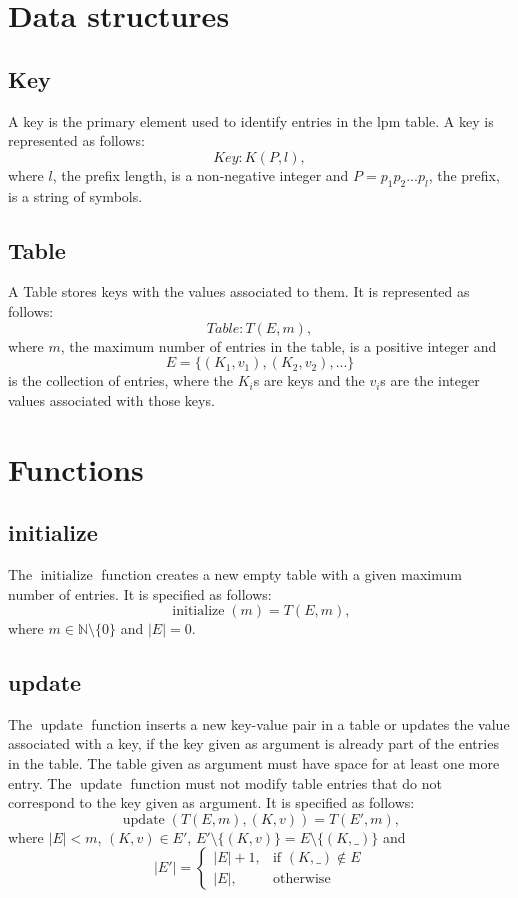 \documentclass{article}
\DeclareMathOperator{\initialize}{initialize}
\DeclareMathOperator{\update}{update}
\begin{document}
\section{Data structures}
\subsection{Key}
A key is the primary element used to identify entries in the lpm table. A key
is represented as follows:
\[
    Key: K(P, l),
\]
where $l$, the prefix length, is a non-negative integer and $P = p_1p_2...p_l$,
the prefix, is a string of symbols.
\subsection{Table}
A Table stores keys with the values associated to them. It is represented as
follows:
\[
    Table: T(E, m),
\]
where $m$, the maximum number of entries in the table, is a positive integer and
\[
    E = \{(K_1, v_1), (K_2, v_2), ...\}
\]
is the collection of entries, where the $K_i$s are keys and the $v_i$s are the
integer values associated with those keys.
\section{Functions}
\subsection{initialize}
The $\initialize$ function creates a new empty table with a given maximum number
of entries. It is specified as follows:
\[
    \initialize(m) = T(E, m),
\]
where $m \in \mathbb{N} \setminus \{0\}$ and $|E| = 0$.
\subsection{update}
The $\update$ function inserts a new key-value pair in a table or updates the value
associated with a key, if the key given as argument is already part of the
entries in the table. The table given as argument must have space for at least
one more entry. The $\update$ function must not modify table entries that do not
correspond to the key given as argument. It is specified as follows:
\[
    \update(T(E, m), (K, v)) = T(E', m),
\]
where $|E| < m$, $(K, v) \in E'$,
$E' \setminus \{(K, v)\} = E \setminus \{(K, \_)\}$ and
\[
    |E'|=
    \begin{cases}
    |E|+1,   & \text{if } (K, \_) \notin E\\
    |E|,  & \text{otherwise}
    \end{cases}
\]
\end{document}
